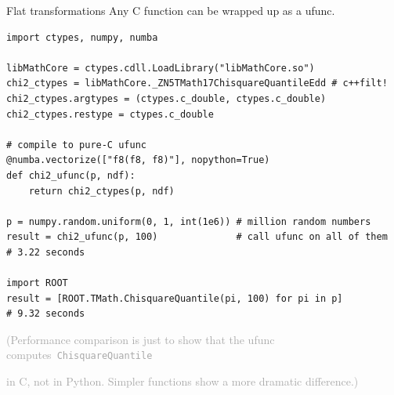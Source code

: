 \documentclass{beamer}
\begin{document}
\begin{frame}[fragile]{Flat transformations}
\vspace{0.3 cm}
Any C function can be wrapped up as a ufunc.

\scriptsize
\begin{verbatim}
import ctypes, numpy, numba

libMathCore = ctypes.cdll.LoadLibrary("libMathCore.so")
chi2_ctypes = libMathCore._ZN5TMath17ChisquareQuantileEdd # c++filt!
chi2_ctypes.argtypes = (ctypes.c_double, ctypes.c_double)
chi2_ctypes.restype = ctypes.c_double

# compile to pure-C ufunc
@numba.vectorize(["f8(f8, f8)"], nopython=True)
def chi2_ufunc(p, ndf):
    return chi2_ctypes(p, ndf)

p = numpy.random.uniform(0, 1, int(1e6)) # million random numbers
result = chi2_ufunc(p, 100)              # call ufunc on all of them
# 3.22 seconds

import ROOT
result = [ROOT.TMath.ChisquareQuantile(pi, 100) for pi in p]
# 9.32 seconds
\end{verbatim}

\vspace{0.1 cm}
\textcolor{darkgray}{(Performance comparison is just to show that the ufunc \mbox{computes {\tt ChisquareQuantile}\hspace{-1 cm}}}

\vspace{-0.1 cm}
\textcolor{darkgray}{in C, not in Python. Simpler functions show a more dramatic difference.)}
\end{frame}
\end{document}
